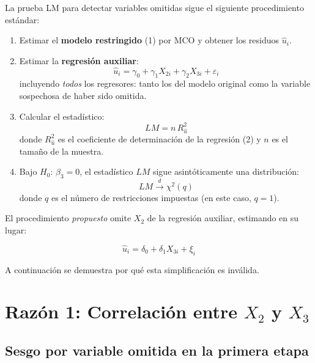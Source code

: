 \documentclass[12pt,letterpaper]{article}
\begin{document}
La prueba LM para detectar variables omitidas sigue el siguiente
procedimiento estándar:

\begin{enumerate}[leftmargin=1.8em]
\item Estimar el \textbf{modelo restringido} (1) por MCO y obtener los
      residuos $\hat{u}_{i}$.
\item Estimar la \textbf{regresión auxiliar}:
      \begin{equation}
        \hat{u}_{i} = \gamma_{0} + \gamma_{1} X_{2i} + \gamma_{2} X_{3i}
                      + \varepsilon_{i}
      \end{equation}
      incluyendo \emph{todos} los regresores: tanto los del modelo
      original como la variable sospechosa de haber sido omitida.
\item Calcular el estadístico:
      \begin{equation}
        LM = n\, R^{2}_{\hat{u}}
      \end{equation}
      donde $R^{2}_{\hat{u}}$ es el coeficiente de determinación de la
      regresión (2) y $n$ es el tamaño de la muestra.
\item Bajo $H_{0}$: $\beta_{3} = 0$, el estadístico $LM$ sigue
      asintóticamente una distribución:
      \begin{equation}
        LM \xrightarrow{d} \chi^{2}(q)
      \end{equation}
      donde $q$ es el número de restricciones impuestas (en este caso,
      $q = 1$).
\end{enumerate}

El procedimiento \emph{propuesto} omite $X_{2}$ de la regresión
auxiliar, estimando en su lugar:

\begin{equation}
\hat{u}_{i} = \delta_{0} + \delta_{1} X_{3i} + \xi_{i}
\end{equation}

A continuación se demuestra por qué esta simplificación es inválida.

\section{Razón 1: Correlación entre $X_{2}$ y $X_{3}$}

\subsection{Sesgo por variable omitida en la primera etapa}
\end{document}
